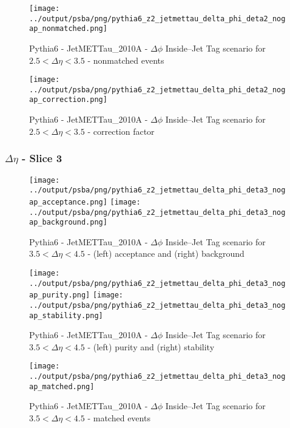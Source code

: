 \documentclass[11pt]{book}
\begin{document}
\begin{figure}[ht]
\centering
\texttt{[image: ../output/psba/png/pythia6\_z2\_jetmettau\_delta\_phi\_deta2\_nogap\_nonmatched.png]}
\caption{Pythia6 - JetMETTau\_2010A - $\Delta\phi$ Inside--Jet Tag scenario for $2.5 < \Delta\eta < 3.5$ - nonmatched events}
\label{fig:p6_jetmettau_delta_phi_deta2_nogap_nonmatched}
\end{figure}

\begin{figure}[ht]
\centering
\texttt{[image: ../output/psba/png/pythia6\_z2\_jetmettau\_delta\_phi\_deta2\_nogap\_correction.png]}
\caption{Pythia6 - JetMETTau\_2010A - $\Delta\phi$ Inside--Jet Tag scenario for $2.5 < \Delta\eta < 3.5$ - correction factor}
\label{fig:p6_jetmettau_delta_phi_deta2_nogap_correction}
\end{figure}

\clearpage
\subsubsection{$\Delta\eta$ - Slice 3}
\begin{figure}[ht]
\centering
\texttt{[image: ../output/psba/png/pythia6\_z2\_jetmettau\_delta\_phi\_deta3\_nogap\_acceptance.png]}
\texttt{[image: ../output/psba/png/pythia6\_z2\_jetmettau\_delta\_phi\_deta3\_nogap\_background.png]}
\caption{Pythia6 - JetMETTau\_2010A - $\Delta\phi$ Inside--Jet Tag scenario for $3.5 < \Delta\eta < 4.5$ - (left) acceptance and (right) background}
\label{fig:p6_jetmettau_delta_phi_deta3_nogap_ab}
\end{figure}

\begin{figure}[ht]
\centering
\texttt{[image: ../output/psba/png/pythia6\_z2\_jetmettau\_delta\_phi\_deta3\_nogap\_purity.png]}
\texttt{[image: ../output/psba/png/pythia6\_z2\_jetmettau\_delta\_phi\_deta3\_nogap\_stability.png]}
\caption{Pythia6 - JetMETTau\_2010A - $\Delta\phi$ Inside--Jet Tag scenario for $3.5 < \Delta\eta < 4.5$ - (left) purity and (right) stability}
\label{fig:p6_jetmettau_delta_phi_deta3_nogap_ps}
\end{figure}

\begin{figure}[ht]
\centering
\texttt{[image: ../output/psba/png/pythia6\_z2\_jetmettau\_delta\_phi\_deta3\_nogap\_matched.png]}
\caption{Pythia6 - JetMETTau\_2010A - $\Delta\phi$ Inside--Jet Tag scenario for $3.5 < \Delta\eta < 4.5$ - matched events}
\label{fig:p6_jetmettau_delta_phi_deta3_nogap_matched}
\end{figure}
\end{document}
